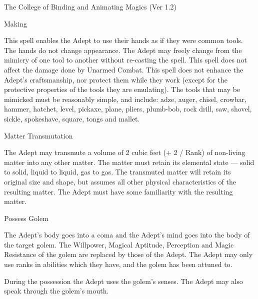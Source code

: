 \begin{Chapter}{The College of Binding and Animating Magics (Ver 1.2)}
\begin{spell}[S-8]{Making}
\begin{effects}
This spell enables the Adept to use their hands as if they were common
tools. The hands do not change appearance.  The Adept may freely
change from the mimicry of one tool to another without re-casting the
spell.  This spell does not affect the damage done by Unarmed Combat.
This spell does not enhance the Adept’s craftsmanship, nor protect
them while they work (except for the protective properties of the
tools they are emulating).  The tools that may be mimicked must be
reasonably simple, and include: adze, auger, chisel, crowbar, hammer,
hatchet, level, pickaxe, plane, pliers, plumb-bob, rock drill, saw,
shovel, sickle, spokeshave, square, tongs and mallet.
\end{effects}
\end{spell}

\begin{spell}[S-9]{Matter Transmutation}

\begin{effects}
The Adept may transmute a volume of 2 cubic feet (+ 2 / Rank) of
non-living matter into any other matter.  The matter must retain its
elemental state --- solid to solid, liquid to liquid, gas to gas.  The
transmuted matter will retain its original size and shape, but assumes
all other physical characteristics of the resulting matter.  The Adept
must have some familiarity with the resulting matter.
\end{effects}
\end{spell}

\begin{spell}[S-10]{Possess Golem}

\begin{effects}
The Adept’s body goes into a coma and the Adept’s mind goes into the
body of the target golem.  The Willpower, Magical Aptitude, Perception
and Magic Resistance of the golem are replaced by those of the Adept.
The Adept may only use ranks in abilities which they have, and the
golem has been attuned to.

During the possession the Adept uses the golem’s senses.  The Adept
may also speak through the golem’s mouth.


\end{effects}
\end{spell}
\end{Chapter}

